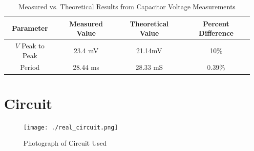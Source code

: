 \documentclass[twocolumn,english]{IEEEtran}
\theoremstyle{plain}
\theoremstyle{plain}
\begin{document}
\begin{table}[h!]
\centering{}
\caption{Measured vs. Theoretical Results from Capacitor Voltage Measurements}
\label{tb:meas_err}
\begin{tabular}{|c|c|c|c|}
\hline
\textbf{Parameter}	&\textbf{Measured Value}		&\textbf{Theoretical Value}	&\textbf{Percent Difference}	\\ \hline
$V$ Peak to Peak	&23.4 mV				&21.14mV 			&10\%				\\ \hline
Period			&28.44 ms				&28.33 mS  			&0.39\% 			\\ \hline
\end{tabular}
\end{table}

\appendices{}

\section{Circuit}\label{append:deriv}

\begin{figure}[h!]
  \begin{centering}
  \begin{center}
  \texttt{[image: ./real\_circuit.png]}
  \label{fig:real_circuit}
  \caption{Photograph of Circuit Used}
  \end{center}
  \par\end{centering}
  \end{figure}

%
%
\end{document}
